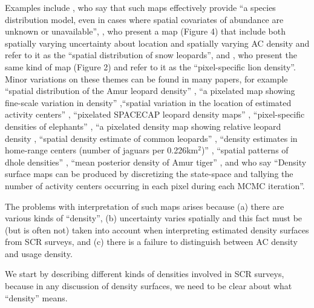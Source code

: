 \documentclass[10pt,a4paper]{article}
\begin{document}
Examples include \cite{Dorazio+Karanth:17}, who say that such maps effectively provide  ``a species distribution model, even in cases where spatial covariates of abundance are unknown or unavailable'', \cite{Alexander+al:15}, who present a map (Figure 4) that include both spatially varying uncertainty about location and spatially varying AC density and refer to it as the ``spatial distribution of snow leopards'', and \cite{Elliot+Gopalaswamy:16}, who present the same kind of map (Figure 2) and refer to it as the ``pixel-specific lion density''. Minor variations on these themes can be found in many papers, for example ``spatial distribution of the Amur leopard density'' \citep{Qi2015}, ``a pixelated map showing fine-scale variation in density'' \citep{Fouche2020},``spatial variation in the location of estimated activity centers'' \citep{Blanc2013}, ``pixelated SPACECAP leopard density maps'' \citep{Devens2021}, ``pixel-specific densities of elephants'' \citep{Goswami2019}, ``a pixelated density map showing relative leopard density \citep{Kandel2020}, ``spatial density estimate of common leopards'' \citep{Goldberg2015}, ``density estimates in home-range centers (number of jaguars per 0.226km$^2$)'' \citep{Lavariega2020}, ``spatial patterns of dhole densities'' \citep{Srivathsa2021}, ``mean posterior density of Amur tiger'' \citep{Xiao2016}, and \cite{Chandler+Royle:13} who say ``Density surface maps can be produced by discretizing the state-space and tallying the number of activity centers occurring in each pixel during each MCMC iteration''.

The problems with interpretation of such maps arises because (a) there are various kinds of ``density'', (b) uncertainty varies spatially and this fact must be (but is often not) taken into account when interpreting estimated density surfaces from SCR surveys, and (c) there is a failure to distinguish between AC density and usage density. 

We start by describing different kinds of densities involved in SCR surveys, because in any discussion of density surfaces, we need to be clear about what ``density'' means. %
\end{document}

